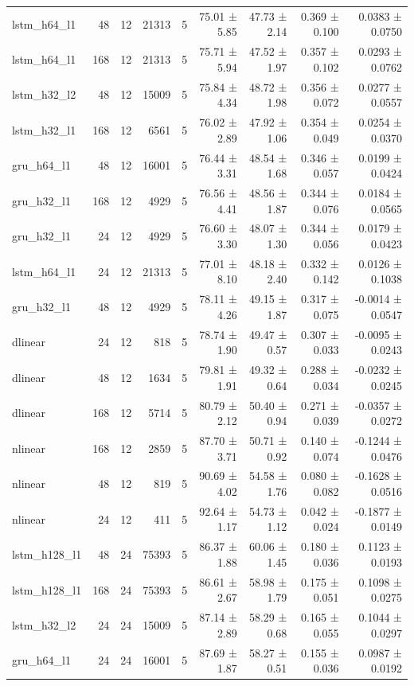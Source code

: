 \begin{table}[htbp]
\begin{tabular}{lrrrrrrrr}
lstm\_h64\_l1 & 48 & 12 & 21313 & 5 & 75.01 ± 5.85 & 47.73 ± 2.14 & 0.369 ± 0.100 & 0.0383 ± 0.0750 \\
lstm\_h64\_l1 & 168 & 12 & 21313 & 5 & 75.71 ± 5.94 & 47.52 ± 1.97 & 0.357 ± 0.102 & 0.0293 ± 0.0762 \\
lstm\_h32\_l2 & 48 & 12 & 15009 & 5 & 75.84 ± 4.34 & 48.72 ± 1.98 & 0.356 ± 0.072 & 0.0277 ± 0.0557 \\
lstm\_h32\_l1 & 168 & 12 & 6561 & 5 & 76.02 ± 2.89 & 47.92 ± 1.06 & 0.354 ± 0.049 & 0.0254 ± 0.0370 \\
gru\_h64\_l1 & 48 & 12 & 16001 & 5 & 76.44 ± 3.31 & 48.54 ± 1.68 & 0.346 ± 0.057 & 0.0199 ± 0.0424 \\
gru\_h32\_l1 & 168 & 12 & 4929 & 5 & 76.56 ± 4.41 & 48.56 ± 1.87 & 0.344 ± 0.076 & 0.0184 ± 0.0565 \\
gru\_h32\_l1 & 24 & 12 & 4929 & 5 & 76.60 ± 3.30 & 48.07 ± 1.30 & 0.344 ± 0.056 & 0.0179 ± 0.0423 \\
lstm\_h64\_l1 & 24 & 12 & 21313 & 5 & 77.01 ± 8.10 & 48.18 ± 2.40 & 0.332 ± 0.142 & 0.0126 ± 0.1038 \\
gru\_h32\_l1 & 48 & 12 & 4929 & 5 & 78.11 ± 4.26 & 49.15 ± 1.87 & 0.317 ± 0.075 & -0.0014 ± 0.0547 \\
dlinear & 24 & 12 & 818 & 5 & 78.74 ± 1.90 & 49.47 ± 0.57 & 0.307 ± 0.033 & -0.0095 ± 0.0243 \\
dlinear & 48 & 12 & 1634 & 5 & 79.81 ± 1.91 & 49.32 ± 0.64 & 0.288 ± 0.034 & -0.0232 ± 0.0245 \\
dlinear & 168 & 12 & 5714 & 5 & 80.79 ± 2.12 & 50.40 ± 0.94 & 0.271 ± 0.039 & -0.0357 ± 0.0272 \\
nlinear & 168 & 12 & 2859 & 5 & 87.70 ± 3.71 & 50.71 ± 0.92 & 0.140 ± 0.074 & -0.1244 ± 0.0476 \\
nlinear & 48 & 12 & 819 & 5 & 90.69 ± 4.02 & 54.58 ± 1.76 & 0.080 ± 0.082 & -0.1628 ± 0.0516 \\
nlinear & 24 & 12 & 411 & 5 & 92.64 ± 1.17 & 54.73 ± 1.12 & 0.042 ± 0.024 & -0.1877 ± 0.0149 \\
lstm\_h128\_l1 & 48 & 24 & 75393 & 5 & 86.37 ± 1.88 & 60.06 ± 1.45 & 0.180 ± 0.036 & 0.1123 ± 0.0193 \\
lstm\_h128\_l1 & 168 & 24 & 75393 & 5 & 86.61 ± 2.67 & 58.98 ± 1.79 & 0.175 ± 0.051 & 0.1098 ± 0.0275 \\
lstm\_h32\_l2 & 24 & 24 & 15009 & 5 & 87.14 ± 2.89 & 58.29 ± 0.68 & 0.165 ± 0.055 & 0.1044 ± 0.0297 \\
gru\_h64\_l1 & 24 & 24 & 16001 & 5 & 87.69 ± 1.87 & 58.27 ± 0.51 & 0.155 ± 0.036 & 0.0987 ± 0.0192 \\

\end{tabular}
\end{table}
